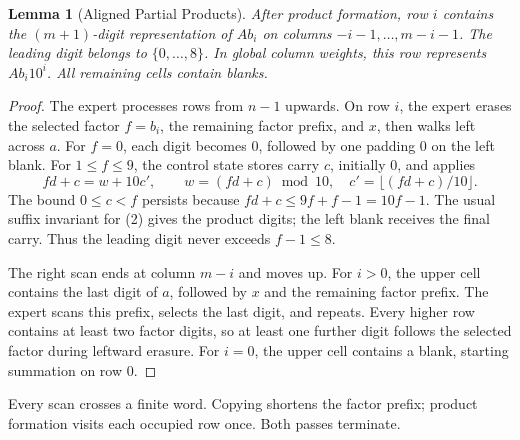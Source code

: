 \documentclass[11pt,a4paper]{article}
\newtheorem{lemma}{Lemma}
\begin{document}
\begin{lemma}[Aligned Partial Products]\label{lem:products}
After product formation, row $i$ contains the $(m+1)$-digit representation
of $A b_i$ on columns $-i-1,\ldots,m-i-1$.
The leading digit belongs to $\{0,\ldots,8\}$.
In global column weights, this row represents $A b_i10^i$.
All remaining cells contain blanks.
\end{lemma}
\begin{proof}
The expert processes rows from $n-1$ upwards. On row $i$, the expert erases
the selected factor $f=b_i$, the remaining factor prefix, and $x$, then
walks left across $a$. For $f=0$, each digit becomes $0$, followed by one
padding $0$ on the left blank. For $1\le f\le9$, the control state stores
carry $c$, initially $0$, and applies
\[
fd+c=w+10c',\qquad
w=(fd+c)\bmod10,\quad c'=\lfloor(fd+c)/10\rfloor. \tag{2}
\]
The bound $0\le c<f$ persists because $fd+c\le9f+f-1=10f-1$.
The usual suffix invariant for (2) gives the product digits; the left blank
receives the final carry. Thus the leading digit never exceeds $f-1\le8$.

The right scan ends at column $m-i$ and moves up. For $i>0$, the upper cell
contains the last digit of $a$, followed by $x$ and the remaining factor prefix.
The expert scans this prefix, selects the last digit, and repeats.
Every higher row contains at least two factor digits, so at least one further
digit follows the selected factor during leftward erasure.
For $i=0$, the upper cell contains a blank, starting summation on row $0$.
\end{proof}

Every scan crosses a finite word. Copying shortens the factor prefix;
product formation visits each occupied row once. Both passes terminate.

\newpage
\end{document}
